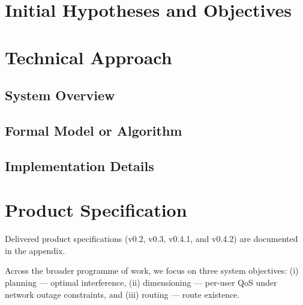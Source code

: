 \documentclass[11pt,a4paper]{article}
\begin{document}
\section{Initial Hypotheses and Objectives}

\section{Technical Approach}
\subsection{System Overview}

\subsection{Formal Model or Algorithm}

\subsection{Implementation Details}

\section{Product Specification}
Delivered product specifications (v0.2, v0.3, v0.4.1, and v0.4.2) are documented in the appendix.

\noindent Across the broader programme of work, we focus on three system objectives:
(i) planning --- optimal interference,
(ii) dimensioning --- per-user QoS under network outage constraints, and
(iii) routing --- route existence.
\end{document}
